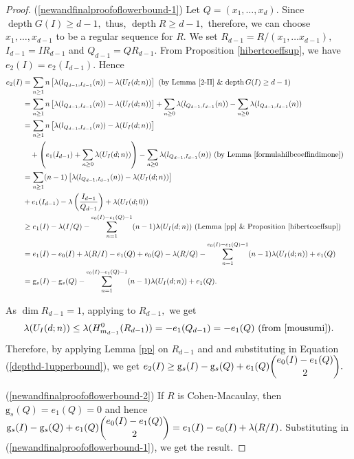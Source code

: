 \documentclass[reqno,a4paper,dvipsnames]{amsart}
\newcommand{\m}{\mathfrak{m} }
\newcommand{\depth}{\operatorname{depth}}
\theoremstyle{definition}
\begin{document}
 \begin{proof}
 (\ref{newandfinalproofoflowerbound-1}) \normalsize
   Let  $Q=(x_1,\ldots,x_{d})$.  Since  $\depth G(I)
     \geq d-1,$ thus,    $\depth R
     \geq d-1,$ therefore, we can choose   $x_1,\ldots,x_{d-1}$ to be a regular sequence   for $R.$ We set $R_{d-1}=R/(x_1,\ldots x_{d-1}),$ $I_{d-1}=IR_{d-1}$ and $Q_{d-1}=QR_{d-1}.$ From Proposition \ref{hibertcoeffsup}, we have $e_{2}(I)=e_{2}(I_{d-1}).$ Hence
     \begin{align} \label{depthd-1upperbound} \nonumber 
    e_{2}(I)
    &= \displaystyle\sum_{n \geq 1} n\left[\lambda(l_{Q_{d-1},I_{d-1}}(n))
- \lambda(U_{I}(d;n))\right] \text{ (by Lemma \ref{2-II} $\&$ $\depth G(I) \geq d-1$)}\\ \nonumber
  &= \sum_{n \geq 1} n\left[\lambda(l_{Q_{d-1},I_{d-1}}(n))- \lambda(U_{I}(d;n))\right]  + \sum_{n \geq 0}\lambda(l_{Q_{d-1},I_{d-1}}(n))
 -  \sum_{n \geq 0}\lambda(l_{Q_{d-1},I_{d-1}}(n))\\ \nonumber
&= \sum_{n \geq 1} n\left[\lambda(l_{Q_{d-1},I_{d-1}}(n))- \lambda(U_{I}(d;n))\right]\\ \nonumber
&  \quad +\left(e_{1}(I_{d-1})+\displaystyle\sum_{n \geq 0}\lambda(U_{I}(d;n))\right)
-  \sum_{n \geq 0}\lambda(l_{Q_{d-1},I_{d-1}}(n))   \text{ (by Lemma \ref{formulahilbcoeffindimone})} \\ \nonumber
&=  \sum_{n \geq 1} (n-1) \left[\lambda(l_{Q_{d-1},I_{d-1}}(n))
- \lambda(U_{I}(d;n))\right] &\\
&+e_1 (I_{d-1}) 
- \lambda\left(  \frac{I_{d-1}}{Q_{d-1}}\right) 
+ \lambda(U_{I}(d;0))  \\ \nonumber
& \geq e_1(I) - \lambda(I/Q) 
- \sum_{n= 1}^{e_{0}(I)-e_{1}(Q)-1} (n-1)\lambda(U_{I}(d;n)) 
 \text{ (Lemma~\ref{pp} $\&$ Proposition~\ref{hibertcoeffsup})}\\ \nonumber
& =e_1(I) - e_0 (I) + \lambda(R/I) 
-e_{1}(Q)+e_0(Q) - \lambda(R/Q)  - \sum_{n = 1}^{e_{0}(I)-e_{1}(Q)-1}  (n-1)\lambda(U_{I}(d;n))+e_{1}(Q)\\  \nonumber
&= \mathrm{g}_{s}(I)-\mathrm{g}_{s}(Q)-
 \sum_{n = 1}^{e_{0}(I)-e_{1}(Q)-1} (n-1)\lambda(U_{I}(d;n))+e_{1}(Q).
\end{align}

As $\dim R_{d-1}=1$, applying \cite[Lemma 2.3]{rv} to $R_{d-1},$ we get 
\begin{eqnarray} \label{ud}
    \lambda (U_{I}(d;n)) 
    \leq \lambda(H_{\mathfrak \m_{d-1}}^{0}(R_{d-1}))=-e_{1}(Q_{d-1})=-e_{1}(Q) \text{ (from \cite[Proposition 3.1]{mousumi})}. 
 \end{eqnarray}
Therefore, by applying Lemma \ref{pp} on $R_{d-1}$ and and substituting  in Equation (\ref{depthd-1upperbound}), we get 
    $e_{2}(I) \geq \mathrm{g}_{s}(I)-\mathrm{g}_{s}(Q)+e_{1}(Q)\dbinom{e_{0}(I)-e_{1}(Q)}{2}.$

(\ref{newandfinalproofoflowerbound-2})
 If $R$ is Cohen-Macaulay, then  $\mathrm{g}_{s}(Q)=e_{1}(Q)=0$ and hence  $\mathrm{g}_{s}(I)-\mathrm{g}_{s}(Q)+e_{1}(Q)\dbinom{e_{0}(I)-e_{1}(Q)}{2} = e_{1}(I)-e_{0}(I)+\lambda(R/I)$. Substituting in  (\ref{newandfinalproofoflowerbound-1}),  we get the result. 
 \end{proof}
\end{document}
